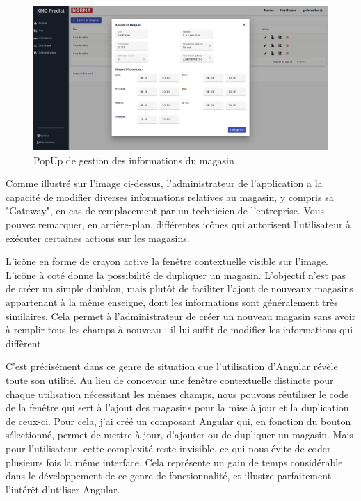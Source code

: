 \documentclass[12pt]{article}
\begin{document}
\begin{figure}[h]
    \centering
    \includegraphics[width=\textwidth]{img/interface_admin_update_mag.png}
    \caption{PopUp de gestion des informations du magasin}
    \label{fig:enter-label}
\end{figure}

\justify
\text Comme illustré sur l'image ci-dessus, l'administrateur de l'application a la capacité de modifier diverses informations relatives au magasin, y compris sa "Gateway", en cas de remplacement par un technicien de l'entreprise. Vous pouvez remarquer, en arrière-plan, différentes icônes qui autorisent l'utilisateur à exécuter certaines actions sur les magasins. 


\justify
\text L'icône en forme de crayon active la fenêtre contextuelle visible sur l'image. L'icône à coté donne la possibilité de dupliquer un magasin. L'objectif n'est pas de créer un simple doublon, mais plutôt de faciliter l'ajout de nouveaux magasins appartenant à la même enseigne, dont les informations sont généralement très similaires. Cela permet à l'administrateur de créer un nouveau magasin sans avoir à remplir tous les champs à nouveau : il lui suffit de modifier les informations qui diffèrent.

\justify
\text C'est précisément dans ce genre de situation que l'utilisation d'Angular révèle toute son utilité. Au lieu de concevoir une fenêtre contextuelle distincte pour chaque utilisation nécessitant les mêmes champs, nous pouvons réutiliser le code de la fenêtre qui sert à l'ajout des magasins pour la mise à jour et la duplication de ceux-ci. Pour cela, j'ai créé un composant Angular qui, en fonction du bouton sélectionné, permet de mettre à jour, d'ajouter ou de dupliquer un magasin. Mais pour l'utilisateur, cette complexité reste invisible, ce qui nous évite de coder plusieurs fois la même interface. Cela représente un gain de temps considérable dans le développement de ce genre de fonctionnalité, et illustre parfaitement l'intérêt d'utiliser Angular.
\end{document}
